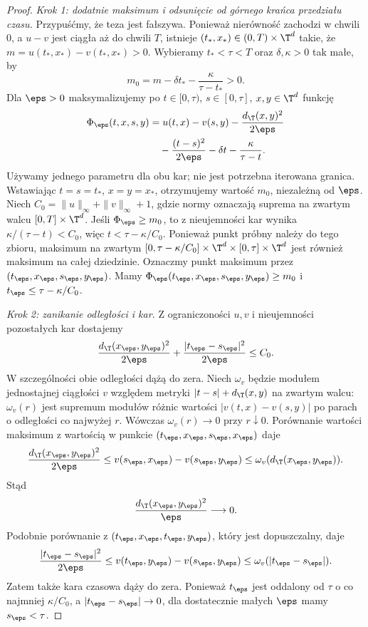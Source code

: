 \begin{proof}
\emph{Krok 1: dodatnie maksimum i odsunięcie od górnego
krańca przedziału czasu.}
Przypuśćmy, że teza jest fałszywa.
Ponieważ nierówność zachodzi w chwili $0$,
a $u-v$ jest ciągła aż do chwili $T$,
istnieje $(t_*,x_*)\in(0,T)\times\T^d$ takie, że
$m=u(t_*,x_*)-v(t_*,x_*)>0$.
Wybieramy $t_*<\tau<T$ oraz $\delta,\kappa>0$
tak małe, by
\[
 m_0=m-\delta t_*-\frac{\kappa}{\tau-t_*}>0.
\]
Dla $\eps>0$ maksymalizujemy po
$t\in[0,\tau)$, $s\in[0,\tau]$, $x,y\in\T^d$ funkcję
\begin{equation}\label{eq:pde23-doubling}
 \begin{split}
 \Phi_\eps(t,x,s,y)
 &=u(t,x)-v(s,y)-\frac{d_{\T}(x,y)^2}{2\eps}\\
 &\quad-\frac{(t-s)^2}{2\eps}
       -\delta t-\frac{\kappa}{\tau-t}.
 \end{split}
\end{equation}
Używamy jednego parametru dla obu kar; nie jest
potrzebna iterowana granica.
Wstawiając $t=s=t_*$, $x=y=x_*$, otrzymujemy
wartość $m_0$, niezależną od $\eps$.
Niech $C_0=\|u\|_\infty+\|v\|_\infty+1$,
gdzie normy oznaczają suprema na zwartym walcu
$[0,T]\times\T^d$.
Jeśli $\Phi_\eps\ge m_0$, to z nieujemności kar
wynika $\kappa/(\tau-t)<C_0$, więc
$t<\tau-\kappa/C_0$. Ponieważ punkt próbny
należy do tego zbioru, maksimum na zwartym
$[0,\tau-\kappa/C_0]\times\T^d\times[0,\tau]\times\T^d$
jest również maksimum na całej dziedzinie.
Oznaczmy punkt maksimum przez $(t_\eps,x_\eps,s_\eps,y_\eps)$.
Mamy $\Phi_\eps(t_\eps,x_\eps,s_\eps,y_\eps)\ge m_0$
i $t_\eps\le\tau-\kappa/C_0$.

\emph{Krok 2: zanikanie odległości i kar.}
Z ograniczoności $u,v$ i nieujemności pozostałych
kar dostajemy
\[
 \frac{d_{\T}(x_\eps,y_\eps)^2}{2\eps}
 +\frac{|t_\eps-s_\eps|^2}{2\eps}\le C_0.
\]
W szczególności obie odległości dążą do zera.
Niech $\omega_v$ będzie modułem jednostajnej
ciągłości $v$ względem metryki
$|t-s|+d_{\T}(x,y)$ na zwartym walcu:
$\omega_v(r)$ jest supremum modułów różnic wartości
$|v(t,x)-v(s,y)|$ po parach o odległości co najwyżej
$r$. Wówczas $\omega_v(r)\to0$ przy $r\downarrow0$.
Porównanie wartości maksimum z wartością w punkcie
$(t_\eps,x_\eps,s_\eps,x_\eps)$ daje
\[
 \frac{d_{\T}(x_\eps,y_\eps)^2}{2\eps}
 \le v(s_\eps,x_\eps)-v(s_\eps,y_\eps)
 \le\omega_v(d_{\T}(x_\eps,y_\eps)).
\]
Stąd
\begin{equation}\label{eq:pde23-pen-small}
 \frac{d_{\T}(x_\eps,y_\eps)^2}{\eps}\longrightarrow0.
\end{equation}
Podobnie porównanie z $(t_\eps,x_\eps,t_\eps,y_\eps)$,
który jest dopuszczalny, daje
\[
 \frac{|t_\eps-s_\eps|^2}{2\eps}
 \le v(t_\eps,y_\eps)-v(s_\eps,y_\eps)
 \le\omega_v(|t_\eps-s_\eps|).
\]
Zatem także kara czasowa dąży do zera.
Ponieważ $t_\eps$ jest oddalony od $\tau$
o co najmniej $\kappa/C_0$, a $|t_\eps-s_\eps|\to0$,
dla dostatecznie małych $\eps$ mamy $s_\eps<\tau$.


\end{proof}
